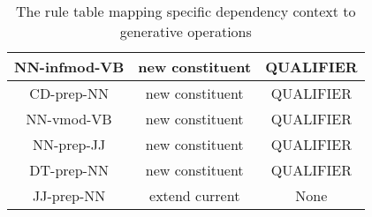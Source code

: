 \begin{table}[!ht]
{\begin{tabular}{|c|c|c|}
            NN-infmod-VB          & new constituent             & QUALIFIER               \\ \hline
            CD-prep-NN            & new constituent             & QUALIFIER               \\ \hline
            NN-vmod-VB            & new constituent             & QUALIFIER               \\ \hline
            NN-prep-JJ            & new constituent             & QUALIFIER               \\ \hline
            DT-prep-NN            & new constituent             & QUALIFIER               \\ \hline
            JJ-prep-NN            & extend current              & None                    \\ \hline
        \end{tabular}%
    }
    \caption{The rule table mapping specific dependency context to generative operations}
    \label{tab:rule-table-complete1}
\end{table}